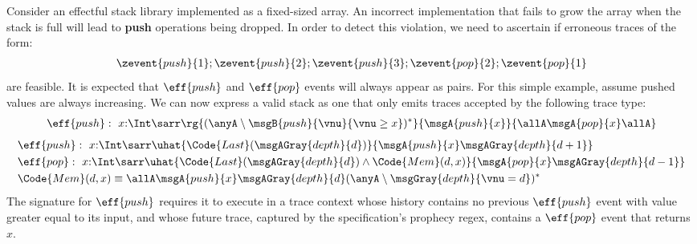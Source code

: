 \begin{example}\label{ex:push-pop} Consider an effectful stack library
  implemented as a fixed-sized array.  An incorrect implementation
  that fails to grow the array when the stack is full will lead to
  \textbf{push} operations being dropped.  In order to detect this
  violation, we need to ascertain if erroneous traces of the form:
  \begin{align*}
  \zevent{push}{1};\zevent{push}{2}; \zevent{push}{3}; \zevent{pop}{2};\zevent{pop}{1}
\end{align*}\noindent
  \noindent are feasible.  It is expected that $\eff{push}$ and
  $\eff{pop}$ events will always appear as pairs.  For this
  simple example, assume pushed values are always
  increasing.  We can now express a valid stack as one that only
  emits traces accepted by the following trace type:
\begin{align*}
  \eff{push} :~ x{:}\Int\sarr \rg{(\anyA \setminus \msgB{push}{\vnu}{\vnu \geq x})^*}{\msgA{push}{x}}{\allA\msgA{pop}{x}\allA}
\end{align*}\noindent
\begin{align*}
  &\eff{push} :~ x{:}\Int\sarr \uhat{\Code{Last}(\msgAGray{depth}{d})}{\msgA{push}{x}\msgAGray{depth}{d+1}}
  \\&\eff{pop} :~ x{:}\Int\sarr \uhat{\Code{Last}(\msgAGray{depth}{d}) \land \Code{Mem}(d, x)}{\msgA{pop}{x}\msgAGray{depth}{d-1}}
  \\&\Code{Mem}(d, x) \equiv \allA\msgA{push}{x}\msgAGray{depth}{d}(\anyA\setminus\msgGray{depth}{\vnu = d})^*
\end{align*}\noindent
The signature for $\eff{push}$ requires it to execute in a
trace context whose history contains no previous $\eff{push}$ event
with value greater equal to its input, and whose future trace,
captured by the specification's prophecy regex, contains a $\eff{pop}$
event that returns $x$.  
\end{example}

